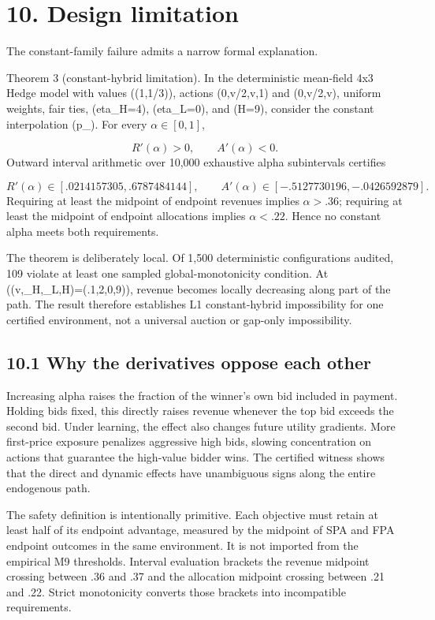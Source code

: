 \documentclass[11pt]{article}
\begin{document}
\section{10. Design limitation}
The constant-family failure admits a narrow formal explanation.

Theorem 3 (constant-hybrid limitation). In the deterministic mean-field 4x3 Hedge model with values ((1,1/3)), actions ({0,v/2,v,1}) and ({0,v/2,v}), uniform weights, fair ties, (eta_H=4), (eta_L=0), and (H=9), consider the constant interpolation (p_\alpha). For every \(\alpha\in[0,1]\),

\[
R'(\alpha)>0,\qquad A'(\alpha)<0.
\]
Outward interval arithmetic over 10,000 exhaustive alpha subintervals certifies

\[
R'(\alpha)\in[.0214157305,.6787484144],\qquad
A'(\alpha)\in[-.5127730196,-.0426592879].
\]
Requiring at least the midpoint of endpoint revenues implies \(\alpha>.36\); requiring at least the midpoint of endpoint allocations implies \(\alpha<.22\). Hence no constant alpha meets both requirements.

The theorem is deliberately local. Of 1,500 deterministic configurations audited, 109 violate at least one sampled global-monotonicity condition. At ((v,\eta_H,\eta_L,H)=(.1,2,0,9)), revenue becomes locally decreasing along part of the path. The result therefore establishes L1 constant-hybrid impossibility for one certified environment, not a universal auction or gap-only impossibility.

\subsection{10.1 Why the derivatives oppose each other}
Increasing alpha raises the fraction of the winner's own bid included in payment. Holding bids fixed, this directly raises revenue whenever the top bid exceeds the second bid. Under learning, the effect also changes future utility gradients. More first-price exposure penalizes aggressive high bids, slowing concentration on actions that guarantee the high-value bidder wins. The certified witness shows that the direct and dynamic effects have unambiguous signs along the entire endogenous path.

The safety definition is intentionally primitive. Each objective must retain at least half of its endpoint advantage, measured by the midpoint of SPA and FPA endpoint outcomes in the same environment. It is not imported from the empirical M9 thresholds. Interval evaluation brackets the revenue midpoint crossing between .36 and .37 and the allocation midpoint crossing between .21 and .22. Strict monotonicity converts those brackets into incompatible requirements.
\end{document}
